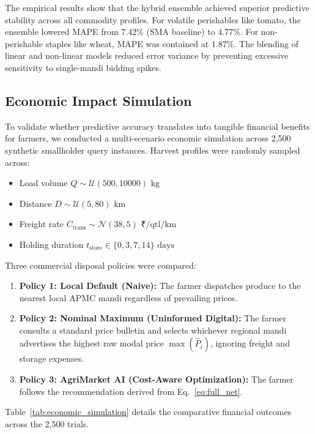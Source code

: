 \documentclass[conference]{IEEEtran}
\begin{document}
The empirical results show that the hybrid ensemble achieved superior predictive stability across all commodity profiles. For volatile perishables like tomato, the ensemble lowered MAPE from $7.42\%$ (SMA baseline) to $4.77\%$. For non-perishable staples like wheat, MAPE was contained at $1.87\%$. The blending of linear and non-linear models reduced error variance by preventing excessive sensitivity to single-mandi bidding spikes.

\subsection{Economic Impact Simulation}
To validate whether predictive accuracy translates into tangible financial benefits for farmers, we conducted a multi-scenario economic simulation across 2,500 synthetic smallholder query instances. Harvest profiles were randomly sampled across:
\begin{itemize}
    \item Load volume $Q \sim \mathcal{U}(500, 10000)\text{ kg}$
    \item Distance $D \sim \mathcal{U}(5, 80)\text{ km}$
    \item Freight rate $C_{\text{trans}} \sim \mathcal{N}(38, 5)\text{ ₹/qtl/km}$
    \item Holding duration $t_{\text{store}} \in \{0, 3, 7, 14\}\text{ days}$
\end{itemize}

Three commercial disposal policies were compared:
\begin{enumerate}
    \item \textbf{Policy 1: Local Default (Naive):} The farmer dispatches produce to the nearest local APMC mandi regardless of prevailing prices.
    \item \textbf{Policy 2: Nominal Maximum (Uninformed Digital):} The farmer consults a standard price bulletin and selects whichever regional mandi advertises the highest raw modal price $\max(\hat{P}_i)$, ignoring freight and storage expenses.
    \item \textbf{Policy 3: AgriMarket AI (Cost-Aware Optimization):} The farmer follows the recommendation derived from Eq.~\eqref{eq:full_net}.
\end{enumerate}

Table~\ref{tab:economic_simulation} details the comparative financial outcomes across the 2,500 trials.
\end{document}
